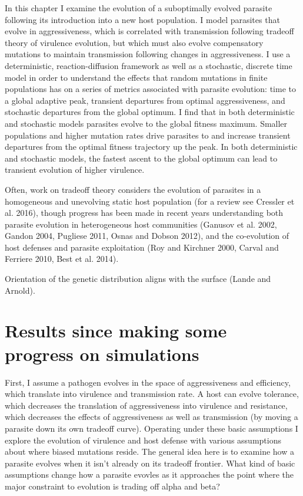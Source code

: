 In this chapter I examine the evolution of a suboptimally evolved parasite following its introduction into a new host population. I model parasites that evolve in aggressiveness, which is correlated with transmission following tradeoff theory of virulence evolution, but which must also evolve compensatory mutations to maintain transmission following changes in aggressiveness. I use a deterministic, reaction-diffusion framework as well as a stochastic, discrete time model in order to understand the effects that random mutations in finite populations has on a series of metrics associated with parasite evolution: time to a global adaptive peak, transient departures from optimal aggressiveness, and stochastic departures from the global optimum. I find that in both deterministic and stochastic models parasites evolve to the global fitness maximum. Smaller populations and higher mutation rates drive parasites to and increase transient departures from the optimal fitness trajectory up the peak. In both deterministic and stochastic models, the fastest ascent to the global optimum can lead to transient evolution of higher virulence.

Often, work on tradeoff theory considers the evolution of parasites in a homogeneous and unevolving static host population (for a review see Cressler et al. 2016), though progress has been made in recent years understanding both parasite evolution in heterogeneous host communities (Ganusov et al. 2002, Gandon 2004, Pugliese 2011, Osnas and Dobson 2012), and the co-evolution of host defenses and parasite exploitation (Roy and Kirchner 2000, Carval and Ferriere 2010, Best et al. 2014).

Orientation of the genetic distribution aligns with the surface (Lande and Arnold).

\section*{Results since making some progress on simulations}

First, I assume a pathogen evolves in the space of aggressiveness and efficiency, which translate into virulence and transmission rate. A host can evolve tolerance, which decreases the translation of aggressiveness into virulence and resistance, which decreases the effects of aggressiveness as well as transmission (by moving a parasite down its own tradeoff curve). Operating under these basic assumptions I explore the evolution of virulence and host defense with various assumptions about where biased mutations reside. The general idea here is to examine how a parasite evolves when it isn't already on its tradeoff frontier. What kind of basic assumptions change how a parasite evovles as it approaches the point where the major constraint to evolution is trading off alpha and beta? 

